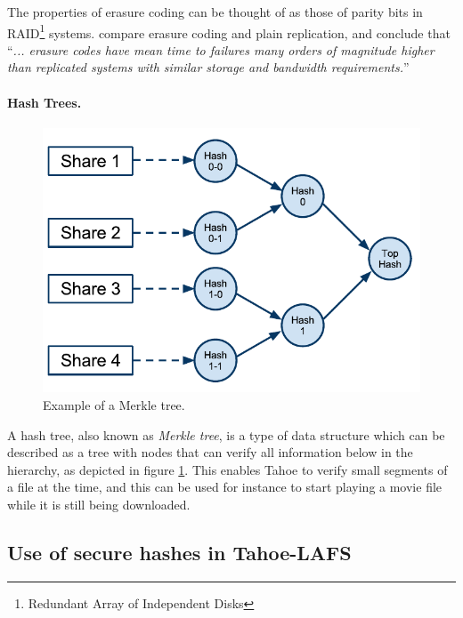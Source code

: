 \documentclass[english,12pt,a4paper]{book}
\begin{document}
The properties of erasure coding can be thought of as those of parity bits in
RAID\footnote{Redundant Array of Independent Disks} systems. \citet*{t_erasure}
compare erasure coding and plain replication, and conclude that ``\emph{...
erasure codes have mean time to failures many orders of magnitude higher than
replicated systems with similar storage and bandwidth requirements.}''

\paragraph{Hash Trees.}

\begin{figure}[h]
    \centering
    \includegraphics[width=0.9\columnwidth]{Tahoe-MerkleTree.pdf}
    \caption{Example of a Merkle tree.}
    \label{fig:tahoemerkletree}
\end{figure}

A hash tree, also known as \emph{Merkle tree}, is a type of data structure
which can be described as a tree with nodes that can verify all information
below in the hierarchy, as depicted in figure \ref{fig:tahoemerkletree}. This
enables Tahoe to verify small segments of a file at the time, and this can be
used for instance to start playing a movie file while it is still being
downloaded.


\subsection{Use of secure hashes in Tahoe-LAFS}
\end{document}
